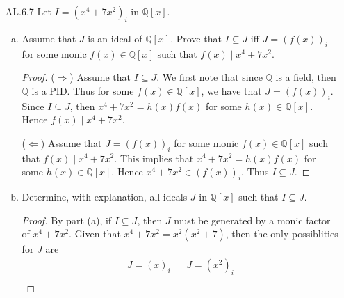 \documentclass[12pt]{article}
\begin{document}
\begin{enumerate}
\begin{enumerate}[(a)]
\begin{proof}
                        $(ab+(r)_i)=(r)_i$. This implies that
                        $(a+(r)_i)(b+(r)_i)=(r)_i$. However, since $R/(r)_i$ is
                        a field, then there are no zero divsors and thus either
                        $(a+(r)_i)=(r)_i$ or $(b+(r)_i)=(r)_i$. That is, either
                        $a\in (r)_i$ or $b\in (r)_i$. Therefore $(r)_i$ is
                        a prime ideal and so $r\in R$ is prime. 
                    \end{proof}
            \end{enumerate}
        \item[AL.6.7] Let $I=(x^4+7x^2)_i$ in $\mathbb{Q}[x]$.
            \begin{enumerate}[(a)]
                \item Assume that $J$ is an ideal of $\mathbb{Q}[x]$. Prove
                    that $I\subseteq J$ iff $J=(f(x))_i$ for some monic
                    $f(x)\in\mathbb{Q}[x]$ such that $f(x)\mid x^4+7x^2$. 
                    \begin{proof}
                        ($\Rightarrow$) Assume that $I\subseteq J$. We first
                        note that since $\mathbb{Q}$ is a field, then
                        $\mathbb{Q}$ is a PID. Thus for some
                        $f(x)\in\mathbb{Q}[x]$, we have that $J=(f(x))_i$.
                        Since $I\subseteq J$, then $x^4+7x^2=h(x)f(x)$ for some
                        $h(x)\in\mathbb{Q}[x]$. Hence $f(x)\mid
                        x^4+7x^2$.\hfill\par ($\Leftarrow$) Assume that
                        $J=(f(x))_i$ for some monic $f(x)\in\mathbb{Q}[x]$ such
                        that $f(x)\mid x^4+7x^2$. This implies that
                        $x^4+7x^2=h(x)f(x)$ for some $h(x)\in\mathbb{Q}[x]$.
                        Hence $x^4+7x^2\in(f(x))_i$. Thus $I\subseteq J$.  
                    \end{proof}
                \item Determine, with explanation, all ideals $J$ in
                    $\mathbb{Q}[x]$ such that $I\subseteq J$. 
                    \begin{proof}
                        By part (a), if $I\subseteq J$, then $J$ must be
                        generated by a monic factor of $x^4+7x^2$. Given that
                        $x^4+7x^2=x^2(x^2+7)$, then the only possiblities for
                        $J$ are
                        \begin{align*}
                            J=(x)_i & &J=(x^2)_i \\

\end{align*}
\end{proof}
\end{enumerate}
\end{enumerate}
\end{document}
